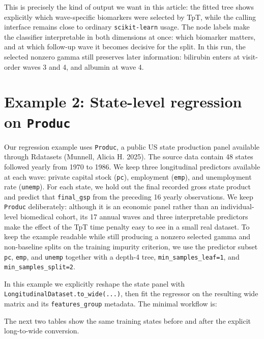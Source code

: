 \documentclass[
]{article}
\begin{document}
This is precisely the kind of output we want in this article: the fitted
tree shows explicitly which wave-specific biomarkers were selected by
TpT, while the calling interface remains close to ordinary
\texttt{scikit-learn} usage. The node labels make the classifier
interpretable in both dimensions at once: which biomarker matters, and
at which follow-up wave it becomes decisive for the split. In this run,
the selected nonzero gamma still preserves later information: bilirubin
enters at visit-order waves 3 and 4, and albumin at wave 4.

\section{\texorpdfstring{Example 2: State-level regression on
\texttt{Produc}}{Example 2: State-level regression on Produc}}\label{example-2-state-level-regression-on-produc}

Our regression example uses \texttt{Produc}, a public US state
production panel available through Rdatasets (Munnell, Alicia H. 2025).
The source data contain 48 states followed yearly from 1970 to 1986. We
keep three longitudinal predictors available at each wave: private
capital stock (\texttt{pc}), employment (\texttt{emp}), and unemployment
rate (\texttt{unemp}). For each state, we hold out the final recorded
gross state product and predict that \texttt{final\_gsp} from the
preceding 16 yearly observations. We keep \texttt{Produc} deliberately:
although it is an economic panel rather than an individual-level
biomedical cohort, its 17 annual waves and three interpretable
predictors make the effect of the TpT time penalty easy to see in a
small real dataset. To keep the example readable while still producing a
nonzero selected gamma and non-baseline splits on the training impurity
criterion, we use the predictor subset \texttt{pc}, \texttt{emp}, and
\texttt{unemp} together with a depth-4 tree,
\texttt{min\_samples\_leaf=1}, and \texttt{min\_samples\_split=2}.

In this example we explicitly reshape the state panel with
\texttt{LongitudinalDataset.to\_wide(...)}, then fit the regressor on
the resulting wide matrix and its \texttt{features\_group} metadata. The
minimal workflow is:

The next two tables show the same training states before and after the
explicit long-to-wide conversion.

\label{tbl-produc-long-preview}

\label{tbl-produc-wide-preview}
\end{document}
